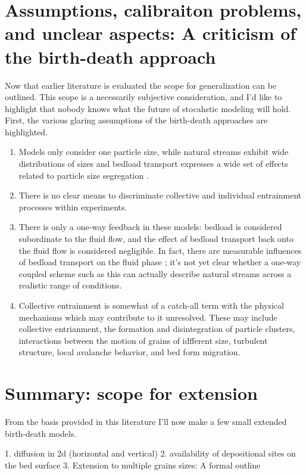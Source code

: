 \section{Assumptions, calibraiton problems, and unclear aspects: A criticism of the birth-death approach} 

Now that earlier literature is evaluated the scope for generalization can be outlined. 
This scope is a necessarily subjective consideration, and I'd like to highlight that nobody knows what the future of stocahstic modeling will hold. 
First, the various glaring assumptions of the birth-death approaches are highlighted. 
\begin{enumerate}
\item Models only consider one particle size, while natural streams exhibit wide distributions of sizes and bedload transport expresses a wide set of effects related to particle size segregation \citep{Wilcock2003, Parker1982, Chen2008}. 
\item There is no clear means to discriminate collective and individual entrainment processes within experiments. 
\item There is only a one-way feedback in these models: bedload is considered subordinate to the fluid flow, and the effect of bedload transport back onto the fluid flow is considered negligible. In fact, there are measurable influences of bedload transport on the fluid phase \citep{}; it's not yet clear whether a one-way coupled scheme such as this can actually describe natural streams across a realistic range of conditions. 
\item Collective entrainment is somewhat of a catch-all term with the physical mechanisms which may contribute to it unresolved. These may include collective entrianment, the formation and disintegration of particle clusters, interactions between the motion of grains of idfferent size, turbulent structure, local avalanche behavior, and bed form migration. 
\end{enumerate}

\section{Summary: scope for extension} 

From the basis provided in this literature I'll now make a few small extended birth-death models. 

1. diffusion in 2d (horizontal and vertical)
2. availability of depositional sites on the bed surface
3. Extension to multiple grains sizes: A formal outline 








